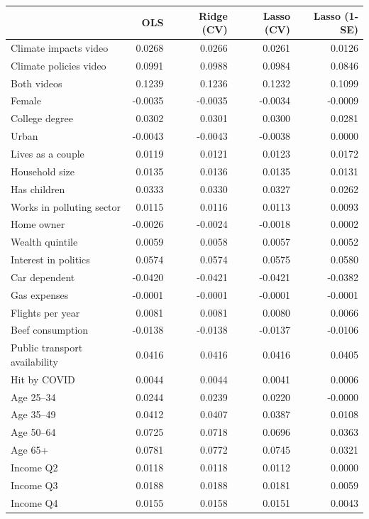 \begin{tabular}{lrrrr}
\toprule
 & OLS & Ridge (CV) & Lasso (CV) & Lasso (1-SE) \\
\midrule
Climate impacts video & 0.0268 & 0.0266 & 0.0261 & 0.0126 \\
Climate policies video & 0.0991 & 0.0988 & 0.0984 & 0.0846 \\
Both videos & 0.1239 & 0.1236 & 0.1232 & 0.1099 \\
Female & -0.0035 & -0.0035 & -0.0034 & -0.0009 \\
College degree & 0.0302 & 0.0301 & 0.0300 & 0.0281 \\
Urban & -0.0043 & -0.0043 & -0.0038 & 0.0000 \\
Lives as a couple & 0.0119 & 0.0121 & 0.0123 & 0.0172 \\
Household size & 0.0135 & 0.0136 & 0.0135 & 0.0131 \\
Has children & 0.0333 & 0.0330 & 0.0327 & 0.0262 \\
Works in polluting sector & 0.0115 & 0.0116 & 0.0113 & 0.0093 \\
Home owner & -0.0026 & -0.0024 & -0.0018 & 0.0002 \\
Wealth quintile & 0.0059 & 0.0058 & 0.0057 & 0.0052 \\
Interest in politics & 0.0574 & 0.0574 & 0.0575 & 0.0580 \\
Car dependent & -0.0420 & -0.0421 & -0.0421 & -0.0382 \\
Gas expenses & -0.0001 & -0.0001 & -0.0001 & -0.0001 \\
Flights per year & 0.0081 & 0.0081 & 0.0080 & 0.0066 \\
Beef consumption & -0.0138 & -0.0138 & -0.0137 & -0.0106 \\
Public transport availability & 0.0416 & 0.0416 & 0.0416 & 0.0405 \\
Hit by COVID & 0.0044 & 0.0044 & 0.0041 & 0.0006 \\
Age 25--34 & 0.0244 & 0.0239 & 0.0220 & -0.0000 \\
Age 35--49 & 0.0412 & 0.0407 & 0.0387 & 0.0108 \\
Age 50--64 & 0.0725 & 0.0718 & 0.0696 & 0.0363 \\
Age 65+ & 0.0781 & 0.0772 & 0.0745 & 0.0321 \\
Income Q2 & 0.0118 & 0.0118 & 0.0112 & 0.0000 \\
Income Q3 & 0.0188 & 0.0188 & 0.0181 & 0.0059 \\
Income Q4 & 0.0155 & 0.0158 & 0.0151 & 0.0043 \\

\end{tabular}
